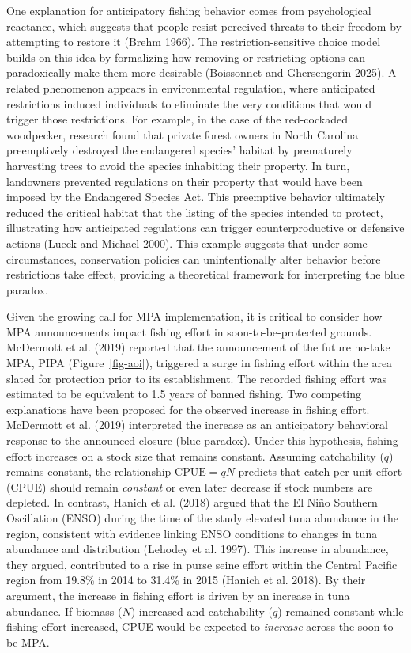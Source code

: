 \documentclass[
  letterpaper,
  DIV=11,
  numbers=noendperiod]{scrartcl}
\begin{document}
One explanation for anticipatory fishing behavior comes from
psychological reactance, which suggests that people resist perceived
threats to their freedom by attempting to restore it (Brehm 1966). The
restriction-sensitive choice model builds on this idea by formalizing
how removing or restricting options can paradoxically make them more
desirable (Boissonnet and Ghersengorin 2025). A related phenomenon
appears in environmental regulation, where anticipated restrictions
induced individuals to eliminate the very conditions that would trigger
those restrictions. For example, in the case of the red-cockaded
woodpecker, research found that private forest owners in North Carolina
preemptively destroyed the endangered species' habitat by prematurely
harvesting trees to avoid the species inhabiting their property. In
turn, landowners prevented regulations on their property that would have
been imposed by the Endangered Species Act. This preemptive behavior
ultimately reduced the critical habitat that the listing of the species
intended to protect, illustrating how anticipated regulations can
trigger counterproductive or defensive actions (Lueck and Michael 2000).
This example suggests that under some circumstances, conservation
policies can unintentionally alter behavior before restrictions take
effect, providing a theoretical framework for interpreting the blue
paradox.

Given the growing call for MPA implementation, it is critical to
consider how MPA announcements impact fishing effort in
soon-to-be-protected grounds. McDermott et al. (2019) reported that the
announcement of the future no-take MPA, PIPA (Figure~\ref{fig-aoi}),
triggered a surge in fishing effort within the area slated for
protection prior to its establishment. The recorded fishing effort was
estimated to be equivalent to 1.5 years of banned fishing. Two competing
explanations have been proposed for the observed increase in fishing
effort. McDermott et al. (2019) interpreted the increase as an
anticipatory behavioral response to the announced closure (blue
paradox). Under this hypothesis, fishing effort increases on a stock
size that remains constant. Assuming catchability (\(q\)) remains
constant, the relationship \(\text{CPUE} = qN\) predicts that catch per
unit effort (CPUE) should remain \emph{constant} or even later decrease
if stock numbers are depleted. In contrast, Hanich et al. (2018) argued
that the El Niño Southern Oscillation (ENSO) during the time of the
study elevated tuna abundance in the region, consistent with evidence
linking ENSO conditions to changes in tuna abundance and distribution
(Lehodey et al. 1997). This increase in abundance, they argued,
contributed to a rise in purse seine effort within the Central Pacific
region from 19.8\% in 2014 to 31.4\% in 2015 (Hanich et al. 2018). By
their argument, the increase in fishing effort is driven by an increase
in tuna abundance. If biomass (\(N\)) increased and catchability (\(q\))
remained constant while fishing effort increased, CPUE would be expected
to \emph{increase} across the soon-to-be MPA.
\end{document}

